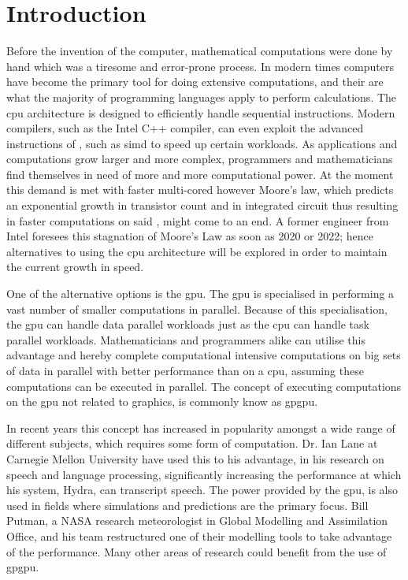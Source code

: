 \chapter{Introduction} %
\label{cha:introduction}
Before the invention of the computer, mathematical computations were done by hand which was a tiresome and error-prone process.
In modern times computers have become the primary tool for doing extensive computations, and their  are what the majority of programming languages apply to perform calculations.
The \acrshort{cpu} architecture is designed to efficiently handle sequential instructions. 
Modern compilers, such as the Intel C++ compiler, can even exploit the advanced instructions of , such as \acrfull{simd} to speed up certain workloads. \citep{INTEL_SIMD}
As applications and computations grow larger and more complex, programmers and mathematicians find themselves in need of more and more computational power. \citep[p. 4]{OpenCL_AMD}
At the moment this demand is met with faster multi-cored  however Moore's law, which predicts an exponential growth in transistor count and in integrated circuit thus resulting in faster computations on said , might come to an end.
A former engineer from Intel foresees this stagnation of Moore's Law as soon as 2020 or 2022; hence alternatives to using the \acrshort{cpu} architecture will be explored in order to maintain the current growth in speed.\citep{Moore2013}

One of the alternative options is the \acrfull{gpu}.
The \acrshort{gpu} is specialised in performing a vast number of smaller computations in parallel.
Because of this specialisation, the \acrshort{gpu} can handle data parallel workloads just as the \acrshort{cpu} can handle task parallel workloads.
Mathematicians and programmers alike can utilise this advantage and hereby complete computational intensive computations on big sets of data in parallel with better performance than on a \acrshort{cpu}, assuming these computations can be executed in parallel.
The concept of executing computations on the \acrshort{gpu} not related to graphics, is commonly know as \acrfull{gpgpu}.

In recent years this concept has increased in popularity amongst a wide range of different subjects, which requires some form of computation. 
Dr. Ian Lane at Carnegie Mellon University have used this to his advantage, in his research on speech and language processing, significantly increasing the performance at which his system, Hydra, can transcript speech. \citep{NvidiaSpotlightIan}
The power provided by the \acrshort{gpu}, is also used in fields where simulations and predictions are the primary focus. 
Bill Putman, a NASA research meteorologist in Global Modelling and Assimilation Office, and his team restructured one of their modelling tools to take advantage of the  performance. \citep{NvidiaSpotlightNasa}
Many other areas of research could benefit from the use of \acrshort{gpgpu}.

